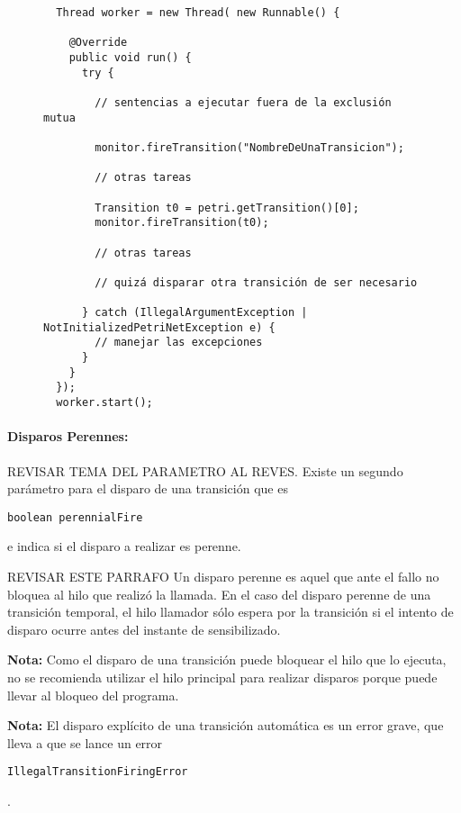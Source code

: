 \begin{figure}[H]
\centering
\begin{verbatim}
  Thread worker = new Thread( new Runnable() {
  
    @Override
    public void run() {
      try {
      
        // sentencias a ejecutar fuera de la exclusión mutua
      
        monitor.fireTransition("NombreDeUnaTransicion");

        // otras tareas
      
        Transition t0 = petri.getTransition()[0];
        monitor.fireTransition(t0);
      
        // otras tareas
      
        // quizá disparar otra transición de ser necesario

      } catch (IllegalArgumentException | NotInitializedPetriNetException e) {
        // manejar las excepciones
      }
    }
  });
  worker.start();
\end{verbatim}
\end{figure}

\paragraph{Disparos Perennes:}
{\color{red} REVISAR TEMA DEL PARAMETRO AL REVES.}
Existe un segundo parámetro para el disparo de una transición que es {
\begin{verbatim}
boolean perennialFire
\end{verbatim}
} e indica si el disparo a realizar es perenne.

{\color{red}REVISAR ESTE PARRAFO}
Un disparo perenne es aquel que ante el fallo no bloquea al hilo que realizó la
llamada. En el caso del disparo perenne de una transición temporal, el hilo
llamador sólo espera por la transición si el intento de disparo ocurre antes del
instante de sensibilizado.

\begin{framed}
\textbf{Nota:} Como el disparo de una transición puede bloquear el hilo que lo
ejecuta, no se recomienda utilizar el hilo principal para realizar disparos
porque puede llevar al bloqueo del programa.
\end{framed}

\begin{framed}
\textbf{Nota:} El disparo explícito de una transición automática es un error
grave, que lleva a que se lance un error
\begin{verbatim} 
IllegalTransitionFiringError
\end{verbatim}
.
\end{framed}

